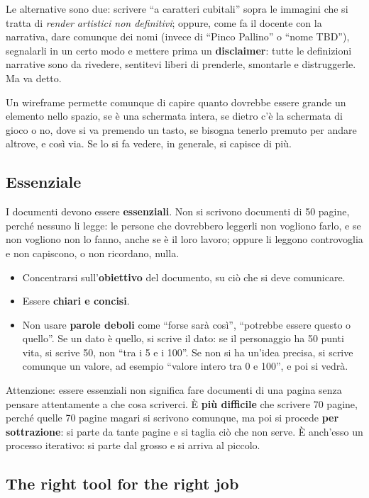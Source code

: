 Le alternative sono due: scrivere ``a caratteri cubitali'' sopra le immagini
che si tratta di \emph{render artistici non definitivi}; oppure, come fa il
docente con la narrativa, dare comunque dei nomi (invece di ``Pinco Pallino''
o ``nome TBD''), segnalarli in un certo modo e mettere prima un
\textbf{disclaimer}: tutte le definizioni narrative sono da rivedere,
sentitevi liberi di prenderle, smontarle e distruggerle. Ma va detto.

Un wireframe permette comunque di capire quanto dovrebbe essere grande un
elemento nello spazio, se è una schermata intera, se dietro c'è la schermata
di gioco o no, dove si va premendo un tasto, se bisogna tenerlo premuto per
andare altrove, e così via. Se lo si fa vedere, in generale, si capisce di più.

\subsection{Essenziale}

I documenti devono essere \textbf{essenziali}. Non si scrivono documenti di
50 pagine, perché nessuno li legge: le persone che dovrebbero leggerli non
vogliono farlo, e se non vogliono non lo fanno, anche se è il loro lavoro;
oppure li leggono controvoglia e non capiscono, o non ricordano, nulla.
\begin{itemize}
  \item Concentrarsi sull'\textbf{obiettivo} del documento, su ciò che si
        deve comunicare.
  \item Essere \textbf{chiari e concisi}.
  \item Non usare \textbf{parole deboli} come ``forse sarà così'', ``potrebbe
        essere questo o quello''. Se un dato è quello, si scrive il dato: se
        il personaggio ha 50 punti vita, si scrive 50, non ``tra i 5 e i
        100''. Se non si ha un'idea precisa, si scrive comunque un valore, ad
        esempio ``valore intero tra 0 e 100'', e poi si vedrà.
\end{itemize}

Attenzione: essere essenziali non significa fare documenti di una pagina
senza pensare attentamente a che cosa scriverci. È \textbf{più difficile} che
scrivere 70 pagine, perché quelle 70 pagine magari si scrivono comunque, ma
poi si procede \textbf{per sottrazione}: si parte da tante pagine e si taglia
ciò che non serve. È anch'esso un processo iterativo: si parte dal grosso e si
arriva al piccolo.

\subsection{The right tool for the right job}

